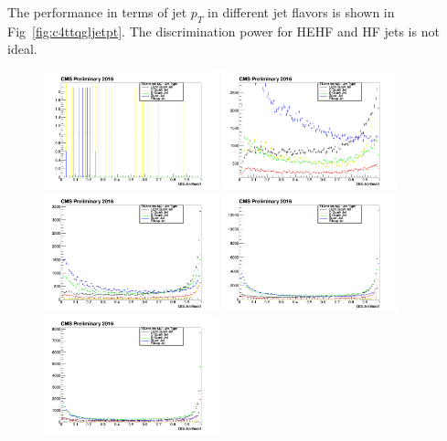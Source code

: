 The performance in terms of jet $p_{T}$ in different jet flavors is shown in Fig~\ref{fig:c4ttqgljetpt}. The discrimination power for HEHF and HF jets is not ideal.
\begin{figure}[htbp]
 \begin{center}
  \includegraphics[width=0.45\textwidth]{sections/mc4/TopTagger/figures/_b_qglikelihoodjetptbin0_.png}
  \includegraphics[width=0.45\textwidth]{sections/mc4/TopTagger/figures/_b_qglikelihoodjetptbin1_.png} \\
  \includegraphics[width=0.45\textwidth]{sections/mc4/TopTagger/figures/_b_qglikelihoodjetptbin2_.png} 
  \includegraphics[width=0.45\textwidth]{sections/mc4/TopTagger/figures/_b_qglikelihoodjetptbin3_.png} \\
  \includegraphics[width=0.45\textwidth]{sections/mc4/TopTagger/figures/_b_qglikelihoodjetptbin4_.png}

\end{center}
\end{figure}
